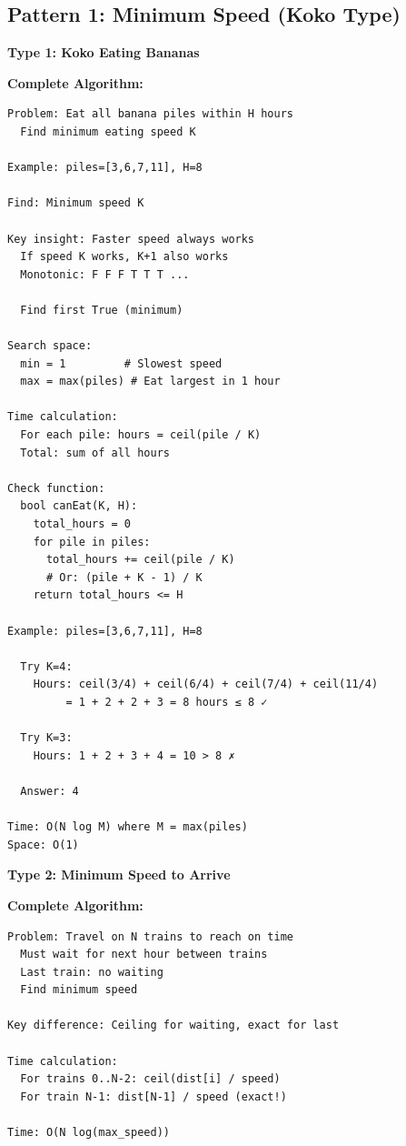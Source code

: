 \documentclass[11pt,a4paper,oneside]{book}
\begin{document}
\subsection{Pattern 1: Minimum Speed (Koko Type)}

\begin{tcolorbox}[
    enhanced,breakable,
    colback=successgreen!10,
    colframe=successgreen,
    boxrule=1.5pt,
    arc=3mm,
    title=\textbf{Complete Minimum Speed Algorithms}
]
\textbf{Type 1: Koko Eating Bananas}

\textbf{Complete Algorithm:}
\begin{verbatim}
Problem: Eat all banana piles within H hours
  Find minimum eating speed K
  
Example: piles=[3,6,7,11], H=8
  
Find: Minimum speed K

Key insight: Faster speed always works
  If speed K works, K+1 also works
  Monotonic: F F F T T T ...
  
  Find first True (minimum)

Search space:
  min = 1         # Slowest speed
  max = max(piles) # Eat largest in 1 hour

Time calculation:
  For each pile: hours = ceil(pile / K)
  Total: sum of all hours

Check function:
  bool canEat(K, H):
    total_hours = 0
    for pile in piles:
      total_hours += ceil(pile / K)
      # Or: (pile + K - 1) / K
    return total_hours <= H

Example: piles=[3,6,7,11], H=8
  
  Try K=4:
    Hours: ceil(3/4) + ceil(6/4) + ceil(7/4) + ceil(11/4)
         = 1 + 2 + 2 + 3 = 8 hours ≤ 8 ✓
  
  Try K=3:
    Hours: 1 + 2 + 3 + 4 = 10 > 8 ✗
  
  Answer: 4

Time: O(N log M) where M = max(piles)
Space: O(1)
\end{verbatim}

\textbf{Type 2: Minimum Speed to Arrive}

\textbf{Complete Algorithm:}
\begin{verbatim}
Problem: Travel on N trains to reach on time
  Must wait for next hour between trains
  Last train: no waiting
  Find minimum speed

Key difference: Ceiling for waiting, exact for last

Time calculation:
  For trains 0..N-2: ceil(dist[i] / speed)
  For train N-1: dist[N-1] / speed (exact!)

Time: O(N log(max_speed))
\end{verbatim}
\end{tcolorbox}
\end{document}
